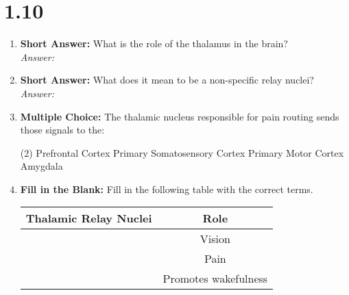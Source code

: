 \section*{1.10}
\begin{enumerate}[label=\textbf{Q1.10.\arabic*}]
      \item \textbf{Short Answer:} What is the role of the thalamus in the brain? \\
            \textit{Answer:} %

      \item \textbf{Short Answer:} What does it mean to be a non-specific relay nuclei? \\
            \textit{Answer:} %

      \item \textbf{Multiple Choice:} The thalamic nucleus responsible for pain routing sends those signals to the:
            \begin{tasks}[label=(\Alph*), label-width=1.5em, item-indent=1.7em](2) %
                  \task Prefrontal Cortex
                  \task Primary Somatosensory Cortex
                  \task Primary Motor Cortex
                  \task Amygdala
            \end{tasks}

      \item \textbf{Fill in the Blank:} Fill in the following table with the correct terms.
      \begin{table}[htbp]
            \centering
            \begin{tabular}{cc}
                  \toprule
                  \textbf{Thalamic Relay Nuclei} & \textbf{Role} \\ \midrule
                  \underline{\hspace{3cm}}       & Vision               \\
                  \underline{\hspace{3cm}}       & Pain                 \\
                  \underline{\hspace{3cm}}       & Promotes wakefulness \\
                  \bottomrule
            \end{tabular}
      \end{table}


\end{enumerate}
